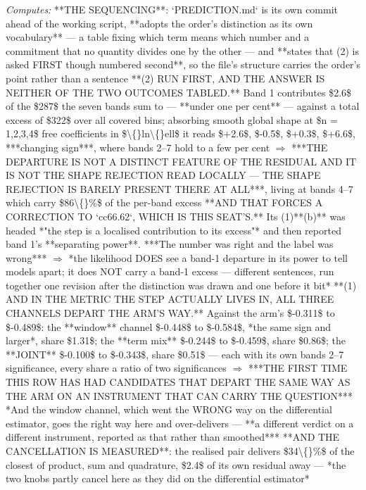 \begin{description}
\emph{Computes:}  **THE SEQUENCING**: `PREDICTION.md` is its own commit ahead of the working script, **adopts the order's distinction as its own vocabulary** --- a table fixing which term means which number and a commitment that no quantity divides one by the other --- and **states that (2) is asked FIRST though numbered second**, so the file's structure carries the order's point rather than a sentence   **(2) RUN FIRST, AND THE ANSWER IS NEITHER OF THE TWO OUTCOMES TABLED.** Band 1 contributes \$2.6\$ of the \$287\$ the seven bands sum to --- **under one per cent** --- against a total excess of \$322\$ over all covered bins; absorbing smooth global shape at \$n = 1,2,3,4\$ free coefficients in \$\textbackslash\{\}ln\textbackslash\{\}ell\$ it reads \$+2.6\$, \$-0.5\$, \$+0.3\$, \$+6.6\$, ***changing sign***, where bands 2--7 hold to a few per cent  \ensuremath{\Rightarrow} ***THE DEPARTURE IS NOT A DISTINCT FEATURE OF THE RESIDUAL AND IT IS NOT THE SHAPE REJECTION READ LOCALLY --- THE SHAPE REJECTION IS BARELY PRESENT THERE AT ALL***, living at bands 4--7 which carry \$86\textbackslash\{\}\%\$ of the per-band excess   **AND THAT FORCES A CORRECTION TO `cc66.62`, WHICH IS THIS SEAT'S.** Its (1)**(b)** was headed *"the step is a localised contribution to its excess"* and then reported band 1's **separating power**.  ***The number was right and the label was wrong*** \ensuremath{\Rightarrow} *the likelihood DOES see a band-1 departure in its power to tell models apart; it does NOT carry a band-1 excess --- different sentences, run together one revision after the distinction was drawn and one before it bit*   **(1) AND IN THE METRIC THE STEP ACTUALLY LIVES IN, ALL THREE CHANNELS DEPART THE ARM'S WAY.** Against the arm's \$-0.311\$ to \$-0.489\$: the **window** channel \$-0.448\$ to \$-0.584\$, *the same sign and larger*, share \$1.31\$; the **term mix** \$-0.244\$ to \$-0.459\$, share \$0.86\$; the **JOINT** \$-0.100\$ to \$-0.343\$, share \$0.51\$ --- each with its own bands 2--7 significance, every share a ratio of two significances  \ensuremath{\Rightarrow} ***THE FIRST TIME THIS ROW HAS HAD CANDIDATES THAT DEPART THE SAME WAY AS THE ARM ON AN INSTRUMENT THAT CAN CARRY THE QUESTION***   *And the window channel, which went the WRONG way on the differential estimator, goes the right way here and over-delivers --- **a different verdict on a different instrument, reported as that rather than smoothed***   **AND THE CANCELLATION IS MEASURED**: the realised pair delivers \$34\textbackslash\{\}\%\$ of the closest of product, sum and quadrature, \$2.4\$ of its own residual away --- *the two knobs partly cancel here as they did on the differential estimator*

\end{description}
